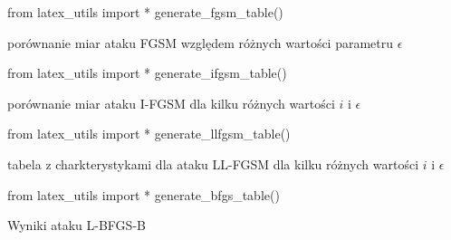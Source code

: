 \documentclass[
    left=2.5cm,         %
    right=2.5cm,        %
    top=2.5cm,          %
    bottom=3cm,         %
    bindingoffset=6mm,  %
    nohyphenation=false %
]{eiti/eiti-thesis}
\begin{document}
\listoffigurestoc     %
\vspace{1cm}          %
\listoftablestoc      %
\vspace{1cm}          %
\listofappendicestoc  %


\label{appendix:tables}

\begin{table}[H]
\begin{adjustbox}{max width=\textwidth}
\begin{pycode}
from latex_utils import *
generate_fgsm_table()
\end{pycode}
\end{adjustbox}
\caption{porównanie miar ataku FGSM względem różnych wartości parametru \(\epsilon\)}
\end{table}

\begin{table}[H]
\begin{adjustbox}{max width=\textwidth}
\begin{pycode}
from latex_utils import *
generate_ifgsm_table()
\end{pycode}
\end{adjustbox}
\caption{porównanie miar ataku I-FGSM dla kilku różnych wartości \(i\) i \(\epsilon\)}
\end{table}

\begin{table}[H]
\begin{adjustbox}{max width=\textwidth}
\begin{pycode}
from latex_utils import *
generate_llfgsm_table()
\end{pycode}
\end{adjustbox}
\caption{tabela z charkterystykami dla ataku LL-FGSM dla kilku różnych wartości \(i\) i \(\epsilon\)}
\end{table}

\begin{table}[H]
\begin{adjustbox}{max width=\textwidth}
\begin{pycode}
from latex_utils import *
generate_bfgs_table()
\end{pycode}

\end{adjustbox}
\caption{Wyniki ataku L-BFGS-B}
\end{table}
\end{document}
